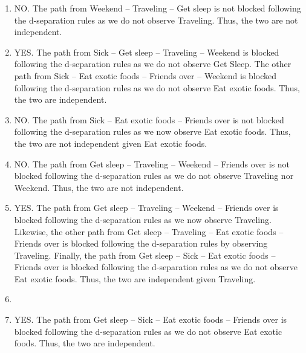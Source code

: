 \documentclass[submit]{harvardml}
\newcommand{\attr}[1]{\textsf{#1}}
\begin{document}
\begin{enumerate}
  \item NO. The path from Weekend -- Traveling -- Get sleep is not blocked following the d-separation rules as we do not observe Traveling. Thus, the two are not independent.
  \item YES. The path from Sick -- Get sleep -- Traveling -- Weekend is blocked following the d-separation rules as we do not observe Get Sleep. The other path from Sick -- Eat exotic foods -- Friends over -- Weekend is blocked following the d-separation rules as we do not observe Eat exotic foods. Thus, the two are independent.
  \item NO. The path from Sick -- Eat exotic foods -- Friends over is not blocked following the d-separation rules as we now observe Eat exotic foods. Thus, the two are not independent given Eat exotic foods.
  \item NO. The path from Get sleep -- Traveling -- Weekend -- Friends over is not blocked following the d-separation rules as we do not observe Traveling nor Weekend. Thus, the two are not independent.
  \item YES. The path from Get sleep -- Traveling -- Weekend -- Friends over is blocked following the d-separation rules as we now observe Traveling. Likewise, the other path from Get sleep -- Traveling -- Eat exotic foods -- Friends over is blocked following the d-separation rules by observing Traveling. Finally, the path from Get sleep -- Sick -- Eat exotic foods -- Friends over is blocked following the d-separation rules as we do not observe Eat exotic foods. Thus, the two are independent given Traveling. 
  \item \quad
  
      \begin{center}
        \end{center}

  \item YES. The path from Get sleep -- Sick -- Eat exotic foods -- Friends over is blocked following the d-separation rules as we do not observe Eat exotic foods. Thus, the two are independent.
\end{enumerate}
\end{document}
